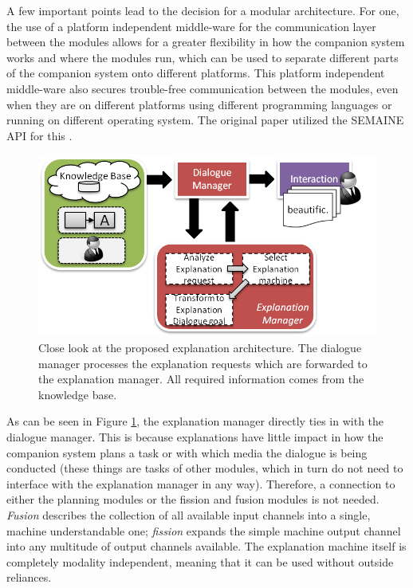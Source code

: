 \documentclass[a4paper]{article}
\begin{document}
A few important points lead to the decision for a modular architecture. For one, the use of a platform independent middle-ware for the communication layer between the modules allows for a greater flexibility in how the companion system works and where the modules run, which can be used to separate different parts of the companion system onto different platforms. This platform independent middle-ware also secures trouble-free communication between the modules, even when they are on different platforms using different programming languages or running on different operating system. The original paper utilized the SEMAINE API for this \cite{schroder2010semaine}.

\begin{figure}[H]
	\centering
	\includegraphics[width=12cm]{expl_arch.png}
	\caption{Close look at the proposed explanation architecture. The dialogue manager processes the explanation requests which are forwarded to the explanation manager. All required information comes from the knowledge base.}
	\label{fig:expl_architecture}
\end{figure}

As can be seen in Figure \ref{fig:expl_architecture}, the explanation manager directly ties in with the dialogue manager. This is because explanations have little impact in how the companion system plans a task or with which media the dialogue is being conducted (these things are tasks of other modules, which in turn do not need to interface with the explanation manager in any way). Therefore, a connection to either the planning modules or the fission and fusion modules is not needed. {\it Fusion} describes the collection of all available input channels into a single, machine understandable one; {\it fission} expands the simple machine output channel into any multitude of output channels available. The explanation machine itself is completely modality independent, meaning that it can be used without outside reliances.
\end{document}
